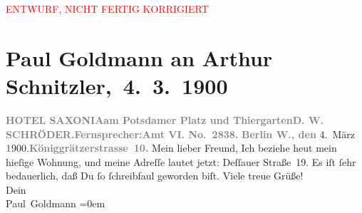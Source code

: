 
\begin{center}
            \textcolor{red}{ENTWURF, NICHT FERTIG KORRIGIERT}
                      \end{center}
            
         
         \renewcommand{\erwaehntePersonen}{Personen: D. W. Schröder}
         \renewcommand{\erwaehnteOrte}{Orte: Berlin, Dessauer Straße, Hotel Saxonia, Potsdamer Platz, Stresemannstraße, Tiergarten, Wien}
         \renewcommand{\erwaehnteWerke}{}
               \section[ Paul Goldmann an Arthur Schnitzler, 4. 3. 1900]{ Paul Goldmann an Arthur Schnitzler, 4. 3. 1900}\nopagebreak{}\rehead{ }\begin{ledgroupsized}[t]{13cm}\normalsize\beginnumbering \toendnotes[C]{\smallbreak\pagebreak[2]} 
\pstart{}{\pb}\textcolor{gray}{\textbf{\textbf{HOTEL SAXONIA}}}\pend{}\pstart{}\textcolor{gray}{\textbf{am Potsdamer Platz und
                        Thiergarten}}\pend{}\pstart{}\textcolor{gray}{\textbf{D. W. SCHRÖDER.}}\pend{}\pstart{}\textcolor{gray}{\textbf{Fernsprecher:}}\pend{}\pstart{}\textcolor{gray}{\textbf{\textbf{Amt VI. No. 2838.}}}\pend{}{\bigskip}\pstart
           \raggedleft{}\textcolor{gray}{\textbf{Berlin W., den}}{ }4. März \textcolor{gray}{\textbf{1}}900.\textcolor{gray}{\textbf{Königgrätzerstrasse 10.}}\pend
           \pstart\center{}Mein lieber Freund,\pend\pstart
           Ich beziehe heut mein hieſige Wohnung, und meine
               Adreſſe lautet jetzt: Deſſauer Straße 19.\pend
           \pstart
           Es iſt ſehr bedauerlich, daß Du ſo ſchreibfaul geworden biſt.\pend
           \pstart
           Viele treue Grüße! {\\[\baselineskip]}Dein {\\[\baselineskip]}\spacefill\mbox{Paul Goldmann}\pend
           \leftskip=0em{}
         
         \endnumbering{}\end{ledgroupsized}\begin{anhang}\end{anhang}\newcommand{\dateiname}{L02906}\newcommand{\titel}{Paul Goldmann an Arthur Schnitzler, 4. 3. 1900}\newcommand{\editorInnen}{Martin Anton Müller und Laura Untner}
      